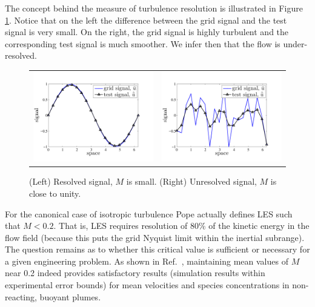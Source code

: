 \documentclass[11pt]{book}
\begin{document}
The concept behind the measure of turbulence resolution is illustrated in Figure \ref{fig_mtr}. Notice that on the left the difference between the grid signal and the test signal is very small.  On the right, the grid signal is highly turbulent and the corresponding test signal is much smoother.  We infer then that the flow is under-resolved.
\begin{figure}[ht]
\centering
\begin{tabular}{rl}
\includegraphics[width=3.2in]{FIGURES/mtr_resolved_signal} &
\includegraphics[width=3.2in]{FIGURES/mtr_unresolved_signal}
\end{tabular}
\vskip-0.2cm
\caption[Examples of the measure of turbulence resolution]{(Left) Resolved signal, $M$ is small. (Right) Unresolved signal, $M$ is close to unity.}
\label{fig_mtr}
\end{figure}

For the canonical case of isotropic turbulence Pope actually defines LES such that $M<0.2$.  That is, LES requires resolution of 80\% of the kinetic energy in the flow field (because this puts the grid Nyquist limit within the inertial subrange).  The question remains as to whether this critical value is sufficient or necessary for a given engineering problem.  As shown in Ref.~\cite{McDermott:2010}, maintaining mean values of $M$ near 0.2 indeed provides satisfactory results (simulation results within experimental error bounds) for mean velocities and species concentrations in non-reacting, buoyant plumes.
\end{document}
